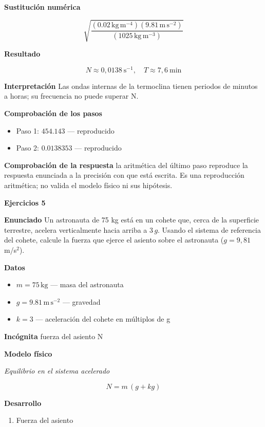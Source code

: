 \documentclass[10pt,openany]{book}
\begin{document}
\noindent\textbf{Sustitución numérica}

\[
\sqrt{\frac{\left(0.02\,\mathrm{kg}\,\mathrm{m}^{-4}\right) \left(9.81\,\mathrm{m}\,\mathrm{s}^{-2}\right)}{\left(1025\,\mathrm{kg}\,\mathrm{m}^{-3}\right)}}
\]

\noindent\textbf{Resultado}

\[
N \approx 0{,}0138\ \mathrm{s^{-1}},\quad T \approx 7{,}6\ \mathrm{min}
\]

\noindent\textbf{Interpretación}
Las ondas internas de la termoclina tienen periodos de minutos a horas; su frecuencia no puede superar N.

\noindent\textbf{Comprobación de los pasos}
\begin{itemize}
\item Paso 1: $454.143$ — reproducido
\item Paso 2: $0.0138353$ — reproducido
\end{itemize}

\noindent\textbf{Comprobación de la respuesta} la aritmética del último paso reproduce la respuesta enunciada a la precisión con que está escrita. Es una reproducción aritmética; no valida el modelo físico ni sus hipótesis.

\noindent\textbf{Ejercicios 5}

\noindent\textbf{Enunciado}
Un astronauta de 75 kg está en un cohete que, cerca de la superficie terrestre, acelera verticalmente hacia arriba a \(3\,g\). Usando el sistema de referencia del cohete, calcule la fuerza que ejerce el asiento sobre el astronauta (\(g = 9{,}81\) m/s\(^2\)).

\noindent\textbf{Datos}
\begin{itemize}
\item $m = 75\,\mathrm{kg}$ — masa del astronauta
\item $g = 9.81\,\mathrm{m}\,\mathrm{s}^{-2}$ — gravedad
\item $k = 3$ — aceleración del cohete en múltiplos de g
\end{itemize}

\noindent\textbf{Incógnita}
fuerza del asiento N

\noindent\textbf{Modelo físico}

\noindent\textit{Equilibrio en el sistema acelerado}

\[
N = m\,(g + k g)
\]

\noindent\textbf{Desarrollo}
\begin{enumerate}
\item
Fuerza del asiento
\end{enumerate}
\end{document}
